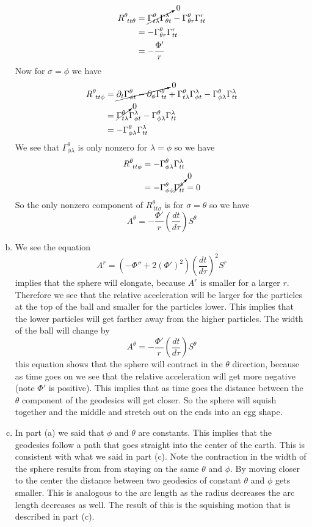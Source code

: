 \documentclass[11pt]{article}
\numberwithin{equation}{section}
\begin{document}
\begin{enumerate}[(a)]
\begin{align*}
R^{\theta}_{\ tt\theta} &= \cancelto{0}{\Gamma^{\theta}_{t\lambda}\Gamma^{\lambda}_{\theta t}} - \Gamma^{\theta}_{\theta r}\Gamma^{r}_{t t}\\
&= -\Gamma^{\theta}_{\theta r}\Gamma^{r}_{t t}\\
&= -\frac{\Phi'}{r}
\end{align*}
Now for $\sigma = \phi$ we have
\begin{align*}
R^{\theta}_{\ tt\phi} &= \cancelto{0}{\partial_{t}\Gamma^{\theta}_{\phi t}-\partial_{\phi}\Gamma^{\theta}_{t t}} + \Gamma^{\theta}_{t\lambda}\Gamma^{\lambda}_{\phi t} - \Gamma^{\theta}_{\phi\lambda}\Gamma^{\lambda}_{t t}\\
&= \cancelto{0}{\Gamma^{\theta}_{t\lambda}}\Gamma^{\lambda}_{\phi t} - \Gamma^{\theta}_{\phi\lambda}\Gamma^{\lambda}_{t t}\\
&=  - \Gamma^{\theta}_{\phi\lambda}\Gamma^{\lambda}_{t t}
\end{align*}
We see that $\Gamma^{\theta}_{\phi\lambda}$ is only nonzero for $\lambda =\phi$ so we have 
\begin{align*}
R^{\theta}_{\ tt\phi} &=  - \Gamma^{\theta}_{\phi\lambda}\Gamma^{\lambda}_{t t}\\
&=  - \Gamma^{\theta}_{\phi\phi}\cancelto{0}{\Gamma^{\phi}_{t t}} = 0
\end{align*}
So the only nonzero component of $R^{\theta}_{\ tt\sigma}$ is for $\sigma = \theta$ so we have
$$A^{\theta} = -\frac{\Phi'}{r}\left(\frac{dt}{d\tau}\right)S^{\theta}$$

\item
We see the equation 
$$A^{r} = \left(-\Phi'' + 2(\Phi')^2\right)\left(\frac{dt}{d\tau}\right)^2S^{r}$$
implies that the sphere will elongate, because $A^{r}$ is smaller for a larger $r$. Therefore we see that the relative acceleration will be larger for the particles at the top of the ball and smaller for the particles lower. This implies that the lower particles will get farther away from the higher particles. The width of the ball will change by
$$A^{\theta} = -\frac{\Phi'}{r}\left(\frac{dt}{d\tau}\right)S^{\theta}$$
this equation shows that the sphere will contract in the $\theta$ direction, because as time goes on we see that the relative acceleration will get more negative (note $\Phi'$ is positive). This implies that as time goes the distance between the $\theta$ component of the geodesics will get closer. So the sphere will squish together and the middle and stretch out on the ends into an egg shape.

\item
In part (a) we said that $\phi$ and $\theta$ are constants. This implies that the geodesics follow a path that goes straight into the center of the earth. This is consistent with what we said in part (c). Note the contraction in the width of the sphere results from from staying on the same $\theta$ and $\phi$. By moving closer to the center the distance between two geodesics of constant $\theta$ and $\phi$ gets smaller. This is analogous to the arc length as the radius decreases the arc length decreases as well. The result of this is the squishing motion that is described in part (c).
\end{enumerate}
\end{document}
